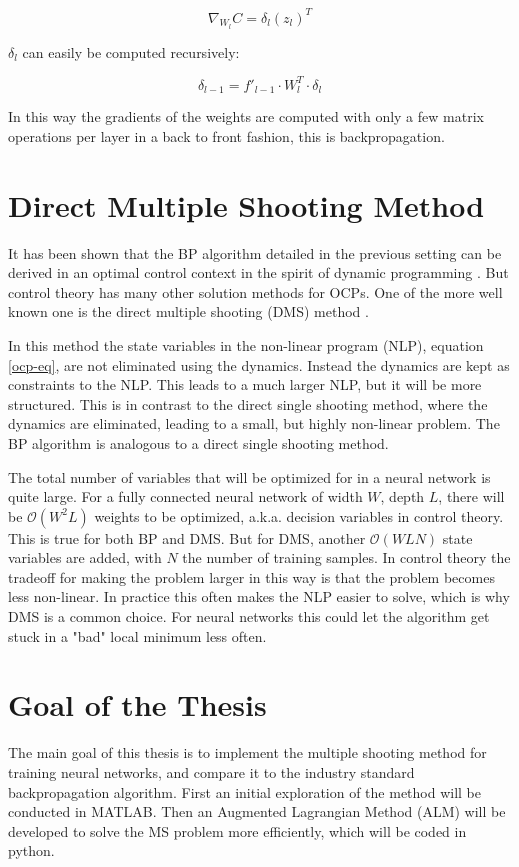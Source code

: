 \begin{equation}
\nabla_{W_l}C=\delta_l(z_l)^T
\end{equation}

$\delta_l$ can easily be computed recursively:

\begin{equation}
\delta_{l-1}  = f'_{l-1} \cdot W_l^T \cdot \delta_l
\end{equation}

In this way the gradients of the weights are computed with only a few matrix operations per layer in a back to front fashion, this is backpropagation.


\section{Direct Multiple Shooting Method}
It has been shown that the BP algorithm detailed in the previous setting can be derived in an optimal control context in the spirit of dynamic programming \cite{mizutani2000}. But control theory has many other solution methods for OCPs. One of the more well known one is the direct multiple shooting (DMS) method \cite{bock1984multiple}.

In this method the state variables in the non-linear program (NLP), equation \ref{ocp-eq}, are not eliminated using the dynamics. Instead the dynamics are kept as constraints to the NLP. This leads to a much larger NLP, but it will be more structured. This is in contrast to the direct single shooting method, where the dynamics are eliminated, leading to a small, but highly non-linear problem. The BP algorithm is analogous to a direct single shooting method.

The total number of variables that will be optimized for in a neural network is quite large. For a fully connected neural network of width $W$, depth $L$, there will be $\mathcal{O}(W^2L)$ weights to be optimized, a.k.a. decision variables in control theory. This is true for both BP and DMS. But for DMS, another $\mathcal{O}(WLN)$ state variables are added, with $N$ the number of training samples. In control theory the tradeoff for making the problem larger in this way is that the problem becomes less non-linear. In practice this often makes the NLP easier to solve, which is why DMS is a common choice. For neural networks this could let the algorithm get stuck in a "bad" local minimum less often.

\section{Goal of the Thesis}
The main goal of this thesis is to implement the multiple shooting method for training neural networks, and compare it to the industry standard backpropagation algorithm. First an initial exploration of the method will be conducted in MATLAB. Then an Augmented Lagrangian Method (ALM) will be developed to solve the MS problem more efficiently, which will be coded in python.


